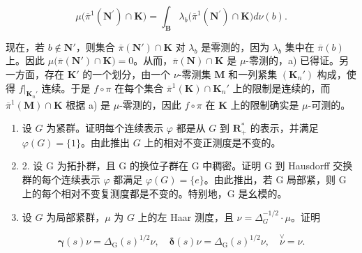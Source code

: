 \[
\mu \big (\overline {{{{\pi}}}} ^ {1} (\mathbf {N} ^ {\prime}) \cap \mathbf {K} \big) = \int_ {\mathbf {B}} \lambda_ {b} \big (\overline {{{{\pi}}}} ^ {1} (\mathbf {N} ^ {\prime}) \cap \mathbf {K} \big) d \nu (b).
\]

现在，若 \(b \notin \mathbf{N}'\)，则集合 \(\overline{\pi}(\mathbf{N}') \cap \mathbf{K}\) 对 \(\lambda_b\) 是零测的，因为 \(\lambda_b\) 集中在 \(\overline{\pi}(b)\) 上。因此 \(\mu\big(\overline{\pi}(\mathbf{N}') \cap \mathbf{K}\big) = 0\)。从而，\(\overline{\pi}(\mathbf{N}) \cap \mathbf{K}\) 是 \(\mu\)-零测的，a) 已得证。另一方面，存在 \(\mathbf{K}'\) 的一个划分，由一个 \(\nu\)-零测集 \(\mathbf{M}\) 和一列紧集 \((\mathbf{K}_n')\) 构成，使得 \(f|_{\mathbf{K}_n'}\) 连续。于是 \(f \circ \pi\) 在每个集合 \(\overline{\pi}^1(\mathbf{K}) \cap \mathbf{K}_n'\) 上的限制是连续的，而 \(\overline{\pi}^1(\mathbf{M}) \cap \mathbf{K}\) 根据 a) 是 \(\mu\)-零测的，因此 \(f \circ \pi\) 在 \(\mathbf{K}\) 上的限制确实是 \(\mu\)-可测的。


\exercisesection{}

\begin{enumerate}
\def\labelenumi{\arabic{enumi})}
\item
  设 \(G\) 为紧群。证明每个连续表示 \(\varphi\) 都是从 \(G\) 到 \(\mathbf{R}_+^*\) 的表示，并满足 \(\varphi(G) = \{1\}\)。由此推出 \(G\) 上的相对不变正测度是不变的。
\item
  2. 设 G 为拓扑群，且 G 的换位子群在 G 中稠密。证明 G 到 Hausdorff 交换群的每个连续表示 \(\varphi\) 都满足 \(\varphi(G) = \{e\}\)。由此推出，若 G 局部紧，则 G 上的每个相对不变复测度都是不变的。特别地，G 是幺模的。
\item
  设 \(G\) 为局部紧群，\(\mu\) 为 \(G\) 上的左 Haar 测度，且 \(\nu = \Delta_G^{-1/2} \cdot \mu\)。证明
\end{enumerate}

\[
\boldsymbol {\gamma} (s) \nu = \Delta_ {\mathrm{G}} (s) ^ {1 / 2} \nu , \quad \boldsymbol {\delta} (s) \nu = \Delta_ {\mathrm{G}} (s) ^ {1 / 2} \nu , \quad \stackrel {\vee} {\nu} = \nu .
\]

